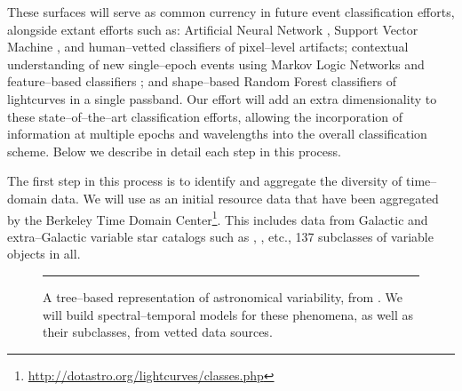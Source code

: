 These surfaces will serve as common currency in future event classification
efforts, alongside extant efforts such as: Artificial Neural Network
\citep{2008AN....329..263D}, Support Vector Machine \citep{2007ApJ...665.1246B},
and human--vetted \citep{2011arXiv1106.5491B} classifiers of pixel--level
artifacts; contextual understanding of new single--epoch events using Markov
Logic Networks \citep{2011arXiv1110.4655D} and feature--based classifiers
\citep{2011arXiv1106.5491B}; and shape--based Random Forest
\citep{2011ApJ...733...10R} classifiers of lightcurves in a single passband. Our
effort will add an extra dimensionality to these state--of--the--art
classification efforts, allowing the incorporation of information at multiple
epochs and wavelengths into the overall classification scheme.  Below we
describe in detail each step in this process.


 \smallskip

The first step in this process is to identify and aggregate the diversity of
time--domain data.  We will use as an initial resource data that have been
aggregated by the Berkeley Time Domain Center\footnote{\url{
http://dotastro.org/lightcurves/classes.php}}.  This includes data from Galactic
and extra--Galactic variable star catalogs such as \cite{2008yCat.2285....0B},
\cite{2001AJ....121..870M}, etc., 137 subclasses of variable objects in all.

\begin{figure}[t]
\centerline{} \smallskip
\caption[]{\footnotesize A tree--based representation of astronomical
variability, from \cite{2008JPhCS.118a2010E}.  We will build spectral--temporal
models for these phenomena, as well as their subclasses, from vetted data
sources.} \medskip \hrule \label{fig:var} \end{figure}

